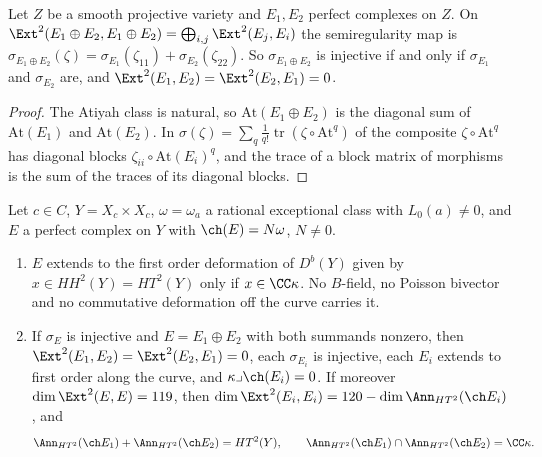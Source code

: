 \begin{lemma}\label{lem:semiregsum}
Let $Z$ be a smooth projective variety and $E_{1},E_{2}$ perfect complexes on
$Z$. On $\Ext^{2}(E_{1}\oplus E_{2},E_{1}\oplus E_{2})=\bigoplus_{i,j}
\Ext^{2}(E_{j},E_{i})$ the semiregularity map is
$\sigma_{E_{1}\oplus E_{2}}(\zeta)=\sigma_{E_{1}}(\zeta_{11})
+\sigma_{E_{2}}(\zeta_{22})$. So $\sigma_{E_{1}\oplus E_{2}}$ is injective if
and only if $\sigma_{E_{1}}$ and $\sigma_{E_{2}}$ are, and
$\Ext^{2}(E_{1},E_{2})=\Ext^{2}(E_{2},E_{1})=0$.
\end{lemma}

\begin{proof}
The Atiyah class is natural, so $\mathrm{At}(E_{1}\oplus E_{2})$ is the
diagonal sum of $\mathrm{At}(E_{1})$ and $\mathrm{At}(E_{2})$. In
$\sigma(\zeta)=\sum_{q}\frac1{q!}\operatorname{tr}(\zeta\circ\mathrm{At}^{q})$
of  the composite $\zeta\circ\mathrm{At}^{q}$ has diagonal blocks
$\zeta_{ii}\circ\mathrm{At}(E_{i})^{q}$, and the trace of a block matrix of
morphisms is the sum of the traces of its diagonal blocks.
\end{proof}

\begin{corollary}
\label{cor:mumfordsplit}
Let $c\in C$, $Y=X_{c}\times X_{c}$, $\omega=\omega_{a}$ a rational
exceptional class with $L_{0}(a)\ne0$, and $E$ a perfect complex on $Y$ with
$\ch(E)=N\omega$, $N\ne0$.
\begin{enumerate}[label=\textup{(\roman*)},leftmargin=2.6em,itemsep=2pt]
\item $E$ extends to the first order deformation of $D^{b}(Y)$ given by
  $x\in HH^{2}(Y)=HT^{2}(Y)$ only if $x\in\CC\kappa$. No $B$-field, no
  Poisson bivector and no commutative deformation off the curve carries it.
\item If $\sigma_{E}$ is injective and $E=E_{1}\oplus E_{2}$ with both
  summands nonzero, then $\Ext^{2}(E_{1},E_{2})=\Ext^{2}(E_{2},E_{1})=0$, each
  $\sigma_{E_{i}}$ is injective, each $E_{i}$ extends to first order along the
  curve, and $\kappa\lrcorner\ch(E_{i})=0$. If moreover
  $\dim\Ext^{2}(E,E)=119$, then $\dim\Ext^{2}(E_{i},E_{i})=
  120-\dim\Ann_{HT^{2}}(\ch E_{i})$, and
  \[
    \Ann_{HT^{2}}(\ch E_{1})+\Ann_{HT^{2}}(\ch E_{2})=HT^{2}(Y),\qquad
    \Ann_{HT^{2}}(\ch E_{1})\cap\Ann_{HT^{2}}(\ch E_{2})=\CC\kappa .
  \]
\end{enumerate}
\end{corollary}

